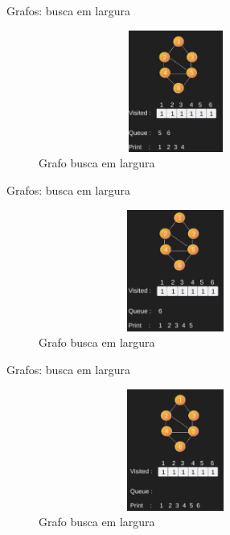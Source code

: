 \begin{frame}
	\begin{block}{Grafos: busca em largura}
		\begin{figure}[!htb]
			\centering	  
			\includegraphics[height=4cm, width = 9cm]{./pic/bfs9.png}
			\caption{Grafo busca em largura \cite{GEEKS_2018}}
		\end{figure}
	\end{block}
\end{frame}

\begin{frame}
	\begin{block}{Grafos: busca em largura}
		\begin{figure}[!htb]
			\centering	  
			\includegraphics[height=4cm, width = 9cm]{./pic/bfs10.png}
			\caption{Grafo busca em largura \cite{GEEKS_2018}}
		\end{figure}
	\end{block}
\end{frame}

\begin{frame}
	\begin{block}{Grafos: busca em largura}
		\begin{figure}[!htb]
			\centering	  
			\includegraphics[height=4cm, width = 9cm]{./pic/bfs11.png}
			\caption{Grafo busca em largura \cite{GEEKS_2018}}
		\end{figure}
	\end{block}
\end{frame}

